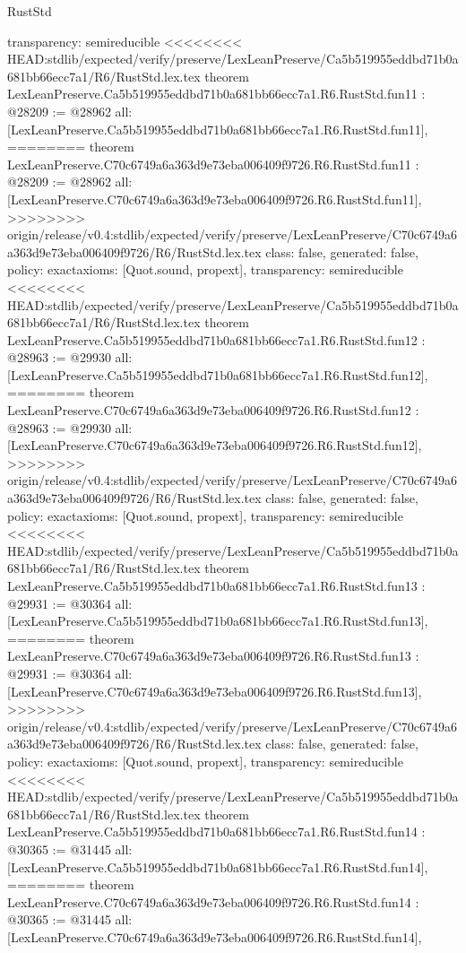 \begin{lexlean}{RustStd}
\begin{coremodule}
{\begin{coremodule}
{{{{{{{{{{{{{{  transparency: semireducible
}
<<<<<<<< HEAD:stdlib/expected/verify/preserve/LexLeanPreserve/Ca5b519955eddbd71b0a681bb66ecc7a1/R6/RustStd.lex.tex
theorem LexLeanPreserve.Ca5b519955eddbd71b0a681bb66ecc7a1.R6.RustStd.fun11 : @28209 := @28962 {
  all: [LexLeanPreserve.Ca5b519955eddbd71b0a681bb66ecc7a1.R6.RustStd.fun11],
========
theorem LexLeanPreserve.C70c6749a6a363d9e73eba006409f9726.R6.RustStd.fun11 : @28209 := @28962 {
  all: [LexLeanPreserve.C70c6749a6a363d9e73eba006409f9726.R6.RustStd.fun11],
>>>>>>>> origin/release/v0.4:stdlib/expected/verify/preserve/LexLeanPreserve/C70c6749a6a363d9e73eba006409f9726/R6/RustStd.lex.tex
  class: false,
  generated: false,
  policy: exact{axioms: [Quot.sound, propext]},
  transparency: semireducible
}
<<<<<<<< HEAD:stdlib/expected/verify/preserve/LexLeanPreserve/Ca5b519955eddbd71b0a681bb66ecc7a1/R6/RustStd.lex.tex
theorem LexLeanPreserve.Ca5b519955eddbd71b0a681bb66ecc7a1.R6.RustStd.fun12 : @28963 := @29930 {
  all: [LexLeanPreserve.Ca5b519955eddbd71b0a681bb66ecc7a1.R6.RustStd.fun12],
========
theorem LexLeanPreserve.C70c6749a6a363d9e73eba006409f9726.R6.RustStd.fun12 : @28963 := @29930 {
  all: [LexLeanPreserve.C70c6749a6a363d9e73eba006409f9726.R6.RustStd.fun12],
>>>>>>>> origin/release/v0.4:stdlib/expected/verify/preserve/LexLeanPreserve/C70c6749a6a363d9e73eba006409f9726/R6/RustStd.lex.tex
  class: false,
  generated: false,
  policy: exact{axioms: [Quot.sound, propext]},
  transparency: semireducible
}
<<<<<<<< HEAD:stdlib/expected/verify/preserve/LexLeanPreserve/Ca5b519955eddbd71b0a681bb66ecc7a1/R6/RustStd.lex.tex
theorem LexLeanPreserve.Ca5b519955eddbd71b0a681bb66ecc7a1.R6.RustStd.fun13 : @29931 := @30364 {
  all: [LexLeanPreserve.Ca5b519955eddbd71b0a681bb66ecc7a1.R6.RustStd.fun13],
========
theorem LexLeanPreserve.C70c6749a6a363d9e73eba006409f9726.R6.RustStd.fun13 : @29931 := @30364 {
  all: [LexLeanPreserve.C70c6749a6a363d9e73eba006409f9726.R6.RustStd.fun13],
>>>>>>>> origin/release/v0.4:stdlib/expected/verify/preserve/LexLeanPreserve/C70c6749a6a363d9e73eba006409f9726/R6/RustStd.lex.tex
  class: false,
  generated: false,
  policy: exact{axioms: [Quot.sound, propext]},
  transparency: semireducible
}
<<<<<<<< HEAD:stdlib/expected/verify/preserve/LexLeanPreserve/Ca5b519955eddbd71b0a681bb66ecc7a1/R6/RustStd.lex.tex
theorem LexLeanPreserve.Ca5b519955eddbd71b0a681bb66ecc7a1.R6.RustStd.fun14 : @30365 := @31445 {
  all: [LexLeanPreserve.Ca5b519955eddbd71b0a681bb66ecc7a1.R6.RustStd.fun14],
========
theorem LexLeanPreserve.C70c6749a6a363d9e73eba006409f9726.R6.RustStd.fun14 : @30365 := @31445 {
  all: [LexLeanPreserve.C70c6749a6a363d9e73eba006409f9726.R6.RustStd.fun14],
}}}}}}}}}}}}}}}}}}
\end{coremodule}}
\end{coremodule}
\end{lexlean}
